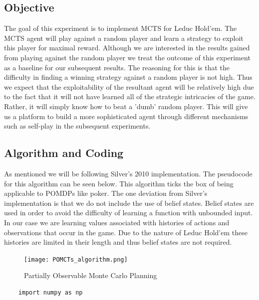 \subsection{Objective}\label{subsec:objective1}
The goal of this experiment is to implement MCTS for Leduc Hold'em.
The MCTS agent will play against a random player and learn a strategy to exploit this player for
maximal reward.
Although we are interested in the results gained from playing against the random player we treat the
outcome of this experiment as a baseline for our subsequent results.
The reasoning for this is that the difficulty in finding a winning strategy against a random player
is not high.
Thus we expect that the exploitability of the resultant agent will be relatively high due to the
fact that it will not have learned all of the strategic intricacies of the game.
Rather, it will simply know how to beat a 'dumb' random player.
This will give us a platform to build a more sophisticated agent through different mechanisms such as
self-play in the subsequent experiments.

\subsection{Algorithm and Coding}\label{subsec:algAndCoding1}
As mentioned we will be following Silver's 2010 implementation.
The pseudocode for this algorithm can be seen below.
This algorithm ticks the box of being applicable to POMDPs like poker.
The one deviation from Silver's implementation is that we do not include the use of belief states.
Belief states are used in order to avoid the difficulty of learning a function with unbounded
input\citep{thrun2000monte}.
In our case we are learning values associated with histories of actions and observations that occur in the game.
Due to the nature of Leduc Hold'em these histories are limited in their length and thus belief states are
not required.

\begin{figure}[ht]
    \texttt{[image: POMCTs\_algorithm.png]}
    \caption{Partially Observable Monte Carlo Planning}
\end{figure}

\lstset{language=Python}
\lstset{frame=lines}
\lstset{basicstyle=\footnotesize}
\begin{lstlisting}
    import numpy as np
\end{lstlisting}

